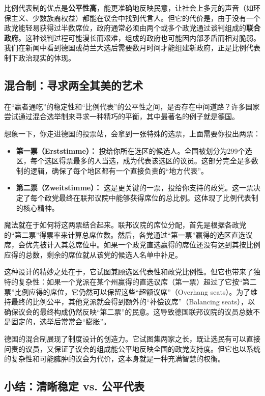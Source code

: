 \documentclass[a5paper, 11pt, openany]{ctexbook}
\begin{document}
比例代表制的优点是\textbf{公平性高}，能更准确地反映民意，让社会上多元的声音（如环保主义、少数族裔权益）都能在议会中找到代言人。但它的代价是，由于没有一个政党能轻易获得过半数席位，政府通常必须由两个或多个政党通过谈判组成的\textbf{联合政府}。这种谈判过程可能漫长而艰难，组成的政府也可能因内部矛盾而相对脆弱。我们在新闻中看到德国或荷兰大选后需要数月时间才能组建新政府，正是比例代表制下政治现实的体现。

\subsection{混合制：寻求两全其美的艺术}

在“赢者通吃”的稳定性和“比例代表”的公平性之间，是否存在中间道路？许多国家尝试通过混合选举制来寻求一种精巧的平衡，其中最著名的例子就是德国。

想象一下，你走进德国的投票站，会拿到一张特殊的选票，上面需要你投出两票：
\begin{itemize}
    \item \textbf{第一票（Erststimme）：} 投给你所在选区的候选人。全国被划分为299个选区，每个选区得票最多的人当选，成为代表该选区的议员。这部分完全是多数制的逻辑，确保了每个地区都有一个直接负责的“地方代表”。
    \item \textbf{第二票（Zweitstimme）：} 这是更关键的一票，投给你支持的政党。这一票决定了每个政党最终在联邦议院中能够获得席位的总比例。这体现了比例代表制的核心精神。
\end{itemize}

魔法就在于如何将这两票结合起来。联邦议院的席位分配，首先是根据各政党的“第二票”得票率来计算总席位数。然后，各党通过“第一票”赢得的选区直选议席，会优先被计入其总席位中。如果一个政党直选赢得的席位还没有达到其按比例应得的总数，剩余的席位就从该党的候选人名单中补足。

这种设计的精妙之处在于，它试图兼顾选区代表性和政党比例性。但它也带来了独特的复杂性：如果一个党派在某个州赢得的直选议席（第一票）超过了它按“第二票”比例应得的席位，它仍然可以保留这些“超额议席”（Overhang seats）。为了维持最终的比例公平，其他党派就会得到额外的“补偿议席”（Balancing seats），以确保议会的最终构成仍然反映“第二票”的民意。这导致德国联邦议院的议员总数不是固定的，选举后常常会“膨胀”。

德国的混合制展现了制度设计的创造力。它试图集两家之长，既让选民有可以直接问责的议员，又保证了议会的组成能公平地反映全国的政党支持度。但它也以系统的复杂性和可能臃肿的议会为代价，这本身就是一种充满智慧的权衡。

\subsection{小结：清晰稳定 vs. 公平代表}
\end{document}
